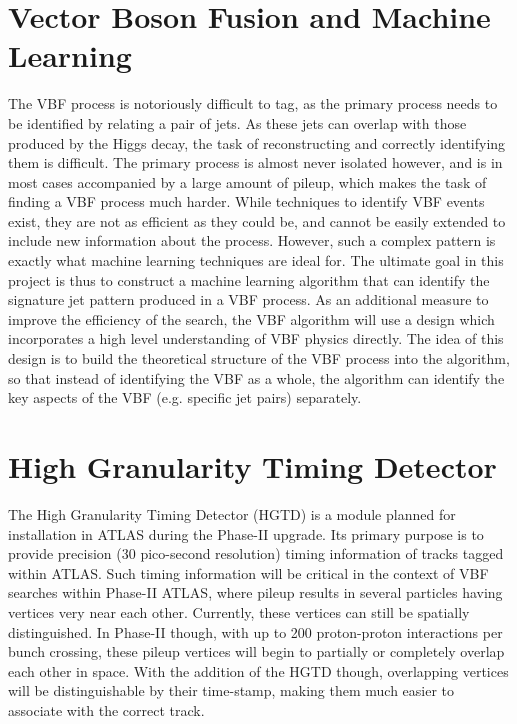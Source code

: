 \documentclass[12pt,letterpaper]{article}
\begin{document}
\section*{Vector Boson Fusion and Machine Learning}
    The VBF process is notoriously difficult to tag, as the primary process needs to be identified by relating a pair of jets. As these jets can overlap with those produced by the Higgs decay, the task of reconstructing and correctly identifying them is difficult. The primary process is almost never isolated however, and is in most cases accompanied by a large amount of pileup, which makes the task of finding a VBF process much harder. While techniques to identify VBF events exist, they are not as efficient as they could be, and cannot be easily extended to include new information about the process. However, such a complex pattern is exactly what machine learning techniques are ideal for. The ultimate goal in this project is thus to construct a machine learning algorithm that can identify the signature jet pattern produced in a VBF process. As an additional measure to improve the efficiency of the search, the VBF algorithm will use a design which incorporates a high level understanding of VBF physics directly. The idea of this design is to build the theoretical structure of the VBF process into the algorithm, so that instead of identifying the VBF as a whole, the algorithm can identify the key aspects of the VBF (e.g. specific jet pairs) separately.



\section*{High Granularity Timing Detector}
    The High Granularity Timing Detector (HGTD) is a module planned for installation in ATLAS during the Phase-II upgrade. Its primary purpose is to provide precision (30 pico-second resolution) timing information of tracks tagged within ATLAS. Such timing information will be critical in the context of VBF searches within Phase-II ATLAS, where pileup results in several particles having vertices very near each other. Currently, these vertices can still be spatially distinguished. In Phase-II though, with up to 200 proton-proton interactions per bunch crossing, these pileup vertices will begin to partially or completely overlap each other in space. With the addition of the HGTD though, overlapping vertices will be distinguishable by their time-stamp, making them much easier to associate with the correct track. 
    
\end{document}
